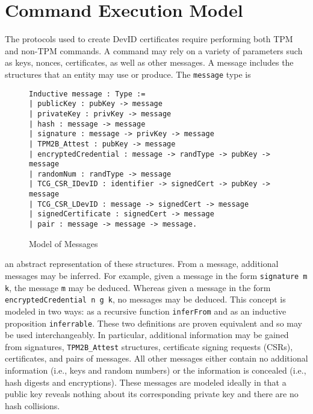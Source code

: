 
\chapter{Command Execution Model}



The protocols used to create DevID certificates require performing both TPM and non-TPM commands.
A command may rely on a variety of parameters such as keys, nonces, certificates, as well as other messages. A message includes the structures that an entity may use or produce. The \verb|message| type is 
\begin{figure}[h]
\begin{lstlisting}[language=Coq]
Inductive message : Type :=
| publicKey : pubKey -> message
| privateKey : privKey -> message
| hash : message -> message
| signature : message -> privKey -> message
| TPM2B_Attest : pubKey -> message
| encryptedCredential : message -> randType -> pubKey -> message
| randomNum : randType -> message
| TCG_CSR_IDevID : identifier -> signedCert -> pubKey -> message
| TCG_CSR_LDevID : message -> signedCert -> message
| signedCertificate : signedCert -> message
| pair : message -> message -> message.
\end{lstlisting}
\caption{Model of Messages}
\end{figure}
an abstract representation of these structures. From a message, additional messages may be inferred. For example, given a message in the form \verb|signature m k|, the message \verb|m| may be deduced. Whereas given a message in the form \verb|encryptedCredential n g k|, no messages may be deduced. This concept is modeled in two ways: as a recursive function \verb|inferFrom| and as an inductive proposition \verb|inferrable|. These two definitions are proven equivalent and so may be used interchangeably. In particular, additional information may be gained from signatures, \verb|TPM2B_Attest| structures, certificate signing requests (CSRs), certificates, and pairs of messages. All other messages either contain no additional information (i.e., keys and random numbers) or the information is concealed (i.e., hash digests and encryptions). These messages are modeled ideally in that a public key reveals nothing about its corresponding private key and there are no hash collisions.



